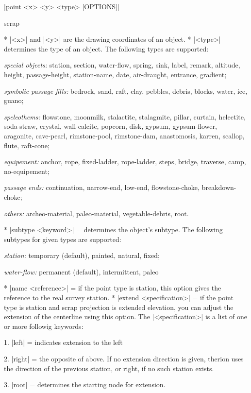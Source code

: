 \syntax
  |point <x> <y> <type> [OPTIONS]|
\endsyntax

\context
  scrap
\endcontext

\arguments
  * |<x>| and |<y>| are the drawing coordinates of an object.
  * |<type>| determines the type of an object. The following
    types are supported: 

    {\it special objects:} station, section, water-flow, spring, sink,
    label, remark, altitude, height, passage-height, station-name,
    date, air-draught, entrance, gradient;

    {\it symbolic passage fills:} bedrock, sand, raft, clay, pebbles,
    debris, blocks, water, ice, guano;

    {\it speleothems:} flowstone, moonmilk, stalactite, stalagmite,
    pillar, curtain, helectite, soda-straw, crystal, wall-calcite,
    popcorn, disk, gypsum, gypsum-flower, aragonite, cave-pearl,
    rimstone-pool, rimstone-dam, anastomosis, karren, scallop,
    flute, raft-cone;

    {\it equipement:} anchor, rope, fixed-ladder, rope-ladder, steps,
    bridge, traverse, camp, no-equipement;

    {\it passage ends:} continuation, narrow-end, low-end, flowstone-choke,
    breakdown-choke;

    {\it others:} archeo-material, paleo-material, vegetable-debris, root.
\endarguments


\options
  * |subtype <keyword>| = determines the object's subtype. The following
    subtypes for given types are supported: 
    
    {\it station:} temporary (default), painted, natural, fixed;

    {\it water-flow:} permanent (default), intermittent, paleo

  * |name <reference>| = if the point type is station, this
    option gives the reference to the real survey station.
  * |extend <specification>| = if the point type is station and scrap
    projection is extended elevation, you can
    adjust the extension of the centerline using this option. The |<specification>| is a list
    of one or more followig keywords:

    1. |left| = indicates extension to the left

    2. |right| = the opposite of above. If no extension direction is
       given, therion uses the direction of the previous station, or
       right, if no such station exists.

    3. |root| = determines the starting node for extension.

